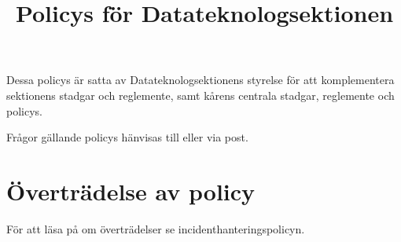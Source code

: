 \documentclass{dtek}
\title{Policys för Datateknologsektionen}
\begin{document}
\maketitle
Dessa policys är satta av Datateknologsektionens styrelse för att komplementera sektionens stadgar och reglemente, samt kårens centrala stadgar, reglemente och policys.

Frågor gällande policys hänvisas till  eller via post.

\tableofcontents

\newpage

\newpage

\newpage

\newpage

\newpage

\section{Överträdelse av policy}
För att läsa på om överträdelser se incidenthanteringspolicyn.

\end{document}
